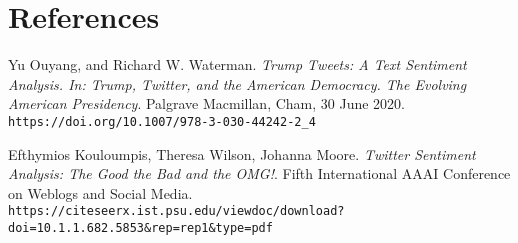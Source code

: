 \documentclass[11pt]{article} %
\begin{document}
\section{References}

\begin{thebibliography}{}
    Yu Ouyang, and Richard W. Waterman. 
    \textit{Trump Tweets: A Text Sentiment Analysis. In: Trump, Twitter, and the American Democracy. The Evolving American Presidency}. 
    Palgrave Macmillan, Cham, 30 June 2020.
    \\\texttt{https://doi.org/10.1007/978-3-030-44242-2\_4}

    Efthymios Kouloumpis, Theresa Wilson, Johanna Moore. 
    \textit{Twitter Sentiment Analysis: The Good the Bad and the OMG!}. 
    Fifth International AAAI Conference on Weblogs and Social Media. 
    \\\texttt{https://citeseerx.ist.psu.edu/viewdoc/download?doi=10.1.1.682.5853\&rep=rep1\&type=pdf}
\end{thebibliography}
\end{document}
